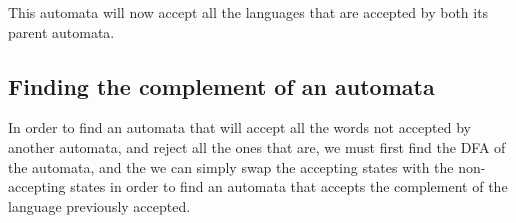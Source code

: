 This automata will now accept all the languages that are accepted by both its
parent automata.

\subsection{Finding the complement of an automata}

In order to find an automata that will accept all the words not accepted by
another automata, and reject all the ones that are, we must first find the DFA
of the automata, and the we can simply swap the accepting states with the non-
accepting states in order to find an automata that accepts the complement of the
language previously accepted.
